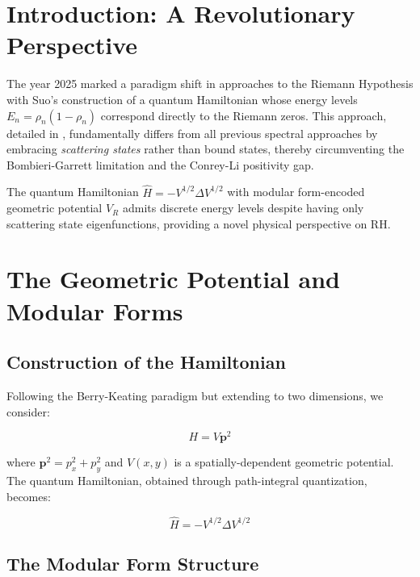 
\section{Introduction: A Revolutionary Perspective}

The year 2025 marked a paradigm shift in approaches to the Riemann Hypothesis with Suo's construction of a quantum Hamiltonian whose energy levels $E_n = \rho_n(1-\rho_n)$ correspond directly to the Riemann zeros. This approach, detailed in \cite{Suo2025}, fundamentally differs from all previous spectral approaches by embracing \emph{scattering states} rather than bound states, thereby circumventing the Bombieri-Garrett limitation and the Conrey-Li positivity gap.

\begin{important}
The quantum Hamiltonian $\hat{H} = -V^{1/2}\Delta V^{1/2}$ with modular form-encoded geometric potential $V_R$ admits discrete energy levels despite having only scattering state eigenfunctions, providing a novel physical perspective on RH.
\end{important}

\section{The Geometric Potential and Modular Forms}

\subsection{Construction of the Hamiltonian}

Following the Berry-Keating paradigm but extending to two dimensions, we consider:

\begin{equation}
H = V \mathbf{p}^2
\end{equation}

where $\mathbf{p}^2 = p_x^2 + p_y^2$ and $V(x,y)$ is a spatially-dependent geometric potential. The quantum Hamiltonian, obtained through path-integral quantization, becomes:

\begin{equation}
\hat{H} = -V^{1/2} \Delta V^{1/2}
\end{equation}

\subsection{The Modular Form Structure}

